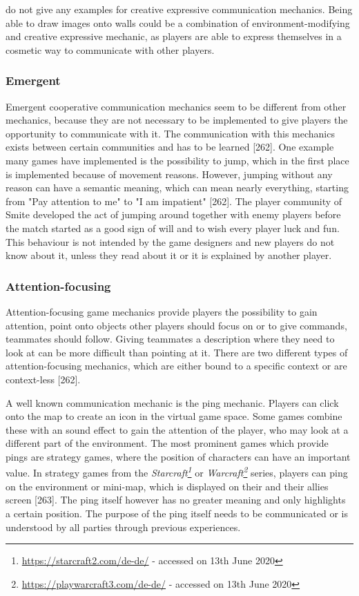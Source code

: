 \textcite{Toups2014ATheory} do not give any examples for creative expressive communication mechanics. Being able to draw images onto walls could be a combination of environment-modifying and creative expressive mechanic, as players are able to express themselves in a cosmetic way to communicate with other players.


\subsubsection{Emergent}
\label{section:Emergent}

Emergent cooperative communication mechanics seem to be different from other mechanics, because they are not necessary to be implemented to give players the opportunity to communicate with it. The communication with this mechanics exists between certain communities and has to be learned \autocite{Toups2014ATheory}[262]. One example many games have implemented is the possibility to jump, which in the first place is implemented because of movement reasons. However, jumping without any reason can have a semantic meaning, which can mean nearly everything, starting from "Pay attention to me" to "I am impatient" \autocite{Toups2014ATheory}[262]. 
The player community of Smite developed the act of jumping around together with enemy players before the match started as a good sign of will and to wish every player luck and fun. This behaviour is not intended by the game designers and new players do not know about it, unless they read about it or it is explained by another player.

\subsubsection{Attention-focusing}
\label{section:Attention-focusing}

Attention-focusing game mechanics provide players the possibility to gain attention, point onto objects other players should focus on or to give commands, teammates should follow. Giving teammates a description where they need to look at can be more difficult than pointing at it. There are two different types of attention-focusing mechanics, which are either bound to a specific context or are context-less \autocite{Toups2014ATheory}[262].


A well known communication mechanic is the ping mechanic. Players can click onto the map to create an icon in the virtual game space. Some games combine these with an sound effect to gain the attention of the player, who may look at a different part of the environment.
The most prominent games which provide pings are strategy games, where the position of characters can have an important value. In strategy games from the \textit{Starcraft\footnote{\url{https://starcraft2.com/de-de/} - accessed on 13th June 2020}} or \textit{Warcraft\footnote{\url{https://playwarcraft3.com/de-de/} - accessed on 13th June 2020}} series, players can ping on the environment or mini-map, which is displayed on their and their allies screen \autocite{Toups2014ATheory}[263]. The ping itself however has no greater meaning and only highlights a certain position. The purpose of the ping itself needs to be communicated or is understood by all parties through previous experiences.


